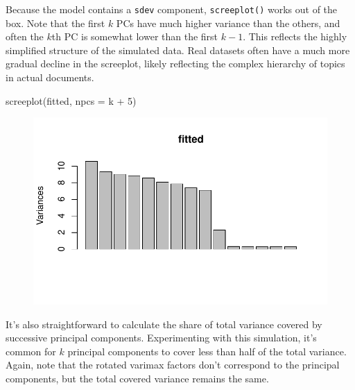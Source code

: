 \documentclass[
]{article}
\newenvironment{Shaded}{\begin{snugshade}}{\end{snugshade}}
\newcommand{\AttributeTok}[1]{\textcolor[rgb]{0.40,0.45,0.13}{#1}}
\newcommand{\DecValTok}[1]{\textcolor[rgb]{0.68,0.00,0.00}{#1}}
\newcommand{\FunctionTok}[1]{\textcolor[rgb]{0.28,0.35,0.67}{#1}}
\newcommand{\NormalTok}[1]{\textcolor[rgb]{0.00,0.23,0.31}{#1}}
\newcommand{\SpecialCharTok}[1]{\textcolor[rgb]{0.37,0.37,0.37}{#1}}
\begin{document}
Because the model contains a \texttt{sdev} component,
\texttt{screeplot()} works out of the box. Note that the first \(k\) PCs
have much higher variance than the others, and often the \(k\)th PC is
somewhat lower than the first \(k-1\). This reflects the highly
simplified structure of the simulated data. Real datasets often have a
much more gradual decline in the screeplot, likely reflecting the
complex hierarchy of topics in actual documents.

\begin{Shaded}
\begin{Highlighting}[]
\FunctionTok{screeplot}\NormalTok{(fitted, }\AttributeTok{npcs =}\NormalTok{ k }\SpecialCharTok{+} \DecValTok{5}\NormalTok{)}
\end{Highlighting}
\end{Shaded}

\begin{figure}[H]

{\centering \includegraphics{paper_files/figure-pdf/unnamed-chunk-11-1.pdf}

}

\end{figure}

It's also straightforward to calculate the share of total variance
covered by successive principal components. Experimenting with this
simulation, it's common for \(k\) principal components to cover less
than half of the total variance. Again, note that the rotated varimax
factors don't correspond to the principal components, but the total
covered variance remains the same.

\begin{Shaded}
\end{Shaded}
\end{document}

